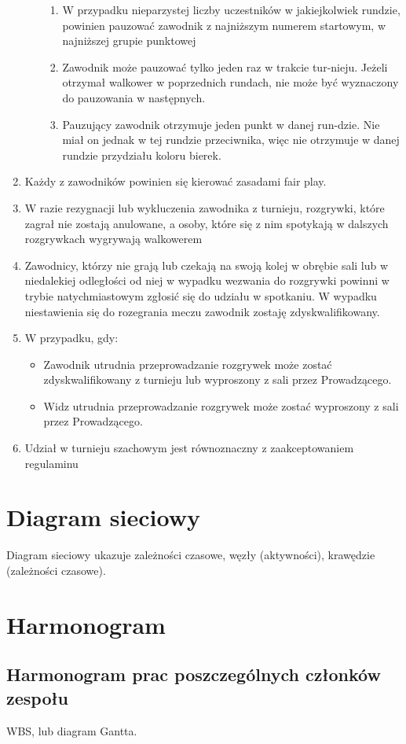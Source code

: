 \begin{enumerate}
\begin{enumerate}
\begin{enumerate}
	\item W przypadku nieparzystej liczby uczestników w jakiejkolwiek rundzie, powinien pauzować zawodnik z najniższym numerem startowym, w najniższej grupie punktowej
	\item Zawodnik może pauzować tylko jeden raz w trakcie tur-nieju. Jeżeli otrzymał walkower w poprzednich rundach, nie może być wyznaczony do pauzowania w następnych.
	\item Pauzujący zawodnik otrzymuje jeden punkt w danej run-dzie. Nie miał on jednak w tej rundzie przeciwnika, więc nie otrzymuje w danej rundzie przydziału koloru bierek.
\end{enumerate}
	\end{enumerate}
	\item Każdy z zawodników powinien się kierować zasadami fair play.
	\item W razie rezygnacji lub wykluczenia zawodnika z turnieju, rozgrywki, które zagrał nie zostają anulowane, a osoby, które się z nim spotykają w dalszych rozgrywkach wygrywają walkowerem 
	\item Zawodnicy, którzy nie grają lub czekają na swoją kolej w obrębie sali lub w niedalekiej odległości od niej w wypadku wezwania do rozgrywki powinni w trybie natychmiastowym zgłosić się do udziału w spotkaniu. W wypadku niestawienia się do rozegrania meczu zawodnik zostaję zdyskwalifikowany.
	\item W przypadku, gdy:
\begin{itemize}
	\item Zawodnik utrudnia przeprowadzanie rozgrywek może zostać zdyskwalifikowany z turnieju lub wyproszony z sali przez Prowadzącego.
	\item Widz utrudnia przeprowadzanie rozgrywek może zostać wyproszony z sali przez Prowadzącego.
\end{itemize}
\item Udział w turnieju szachowym jest równoznaczny z zaakceptowaniem regulaminu
\end{enumerate}
\section{Diagram sieciowy}
Diagram sieciowy ukazuje zależności czasowe, węzły (aktywności), krawędzie (zależności czasowe).


\section{Harmonogram}
\subsection{Harmonogram prac poszczególnych członków zespołu}
WBS, lub diagram Gantta.


